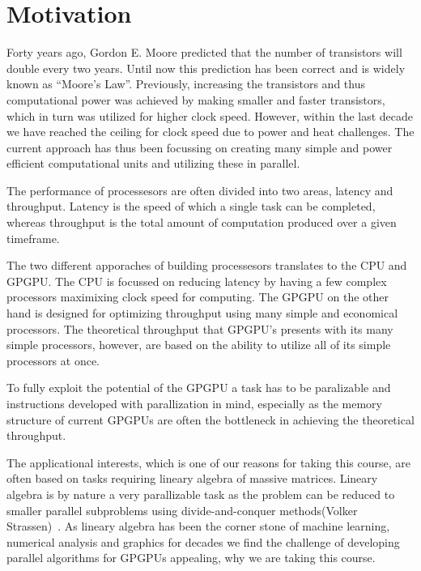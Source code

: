 ﻿\section{Motivation}
\label{sec:motivation}

Forty years ago, Gordon E. Moore predicted that the number of transistors will double every two years. Until now this prediction has been correct and is widely known as ``Moore's Law''. Previously, increasing the transistors and thus computational power was achieved by making smaller and faster transistors, which in turn was utilized for higher clock speed. However, within the last decade we have reached the ceiling for clock speed due to power and heat challenges. The current approach has thus been focussing on creating many simple and power efficient computational units and utilizing these in parallel.~\cite{udacity, schaller1997moore,bryant2003computer}

The performance of processesors are often divided into two areas, latency and throughput. Latency is the speed of which a single task can be completed, whereas throughput is the total amount of computation produced over a given timeframe.~\cite{farber2011cuda}

The two different apporaches of building processesors translates to the CPU and GPGPU. The CPU is focussed on reducing latency by having a few complex processors maximixing clock speed for computing. The GPGPU on the other hand is designed for optimizing throughput using many simple and economical processors. The theoretical throughput that GPGPU's presents with its many simple processors, however, are based on the ability to utilize all of its simple processors at once.

To fully exploit the potential of the GPGPU a task has to be paralizable and instructions developed with parallization in mind, especially as the memory structure of current GPGPUs are often the bottleneck in achieving the theoretical throughput.

The applicational interests, which is one of our reasons for taking this course, are often based on tasks requiring lineary algebra of massive matrices. Lineary algebra is by nature a very parallizable task as the problem can be reduced to smaller parallel subproblems using divide-and-conquer methods(Volker Strassen)~\cite{amdahlorgustafson2011,chen2014data}. As lineary algebra has been the corner stone of machine learning, numerical analysis and graphics for decades we find the challenge of developing parallel algorithms for GPGPUs appealing, why we are taking this course.
